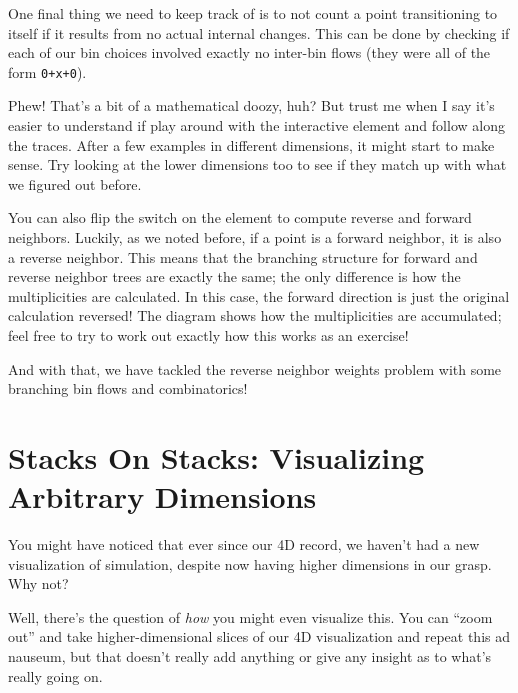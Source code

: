\documentclass[]{article}
\begin{document}
One final thing we need to keep track of is to not count a point transitioning
to itself if it results from no actual internal changes. This can be done by
checking if each of our bin choices involved exactly no inter-bin flows (they
were all of the form \texttt{0+x+0}).

Phew! That's a bit of a mathematical doozy, huh? But trust me when I say it's
easier to understand if play around with the interactive element and follow
along the traces. After a few examples in different dimensions, it might start
to make sense. Try looking at the lower dimensions too to see if they match up
with what we figured out before.

You can also flip the switch on the element to compute reverse and forward
neighbors. Luckily, as we noted before, if a point is a forward neighbor, it is
also a reverse neighbor. This means that the branching structure for forward and
reverse neighbor trees are exactly the same; the only difference is how the
multiplicities are calculated. In this case, the forward direction is just the
original calculation reversed! The diagram shows how the multiplicities are
accumulated; feel free to try to work out exactly how this works as an exercise!

And with that, we have tackled the reverse neighbor weights problem with some
branching bin flows and combinatorics!

\hypertarget{stacks-on-stacks-visualizing-arbitrary-dimensions}{%
\section{Stacks On Stacks: Visualizing Arbitrary
Dimensions}\label{stacks-on-stacks-visualizing-arbitrary-dimensions}}

You might have noticed that ever since our 4D record, we haven't had a new
visualization of simulation, despite now having higher dimensions in our grasp.
Why not?

Well, there's the question of \emph{how} you might even visualize this. You can
``zoom out'' and take higher-dimensional slices of our 4D visualization and
repeat this ad nauseum, but that doesn't really add anything or give any insight
as to what's really going on.
\end{document}
